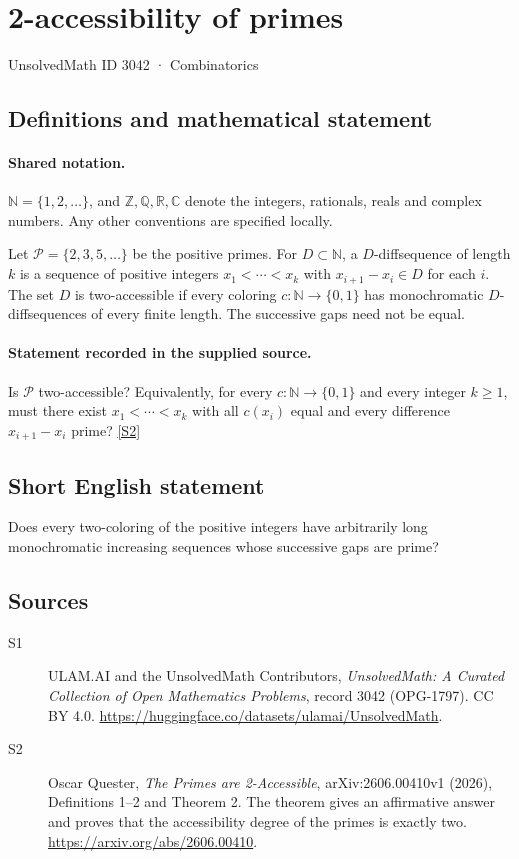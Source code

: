 \documentclass[11pt]{article}
\newcommand{\sref}[2]{\hyperlink{source:#1:#2}{[S#2]}}
\begin{document}
\setcounter{section}{3041}
\section{2-accessibility of primes}\label{3042}
{\small\sffamily UnsolvedMath ID 3042 · Combinatorics}
\subsection{Definitions and mathematical statement}

\paragraph{Shared notation.}$\mathbb N=\{1,2,\ldots\}$, and $\mathbb Z,\mathbb Q,\mathbb R,\mathbb C$ denote the integers, rationals, reals and complex numbers. Any other conventions are specified locally.


Let $\mathcal P=\{2,3,5,\ldots\}$ be the positive primes. For $D\subset\mathbb N$, a $D$-diffsequence of length $k$ is a sequence of positive integers $x_1<\cdots<x_k$ with $x_{i+1}-x_i\in D$ for each $i$. The set $D$ is two-accessible if every coloring $c:\mathbb N\to\{0,1\}$ has monochromatic $D$-diffsequences of every finite length. The successive gaps need not be equal.
\paragraph{Statement recorded in the supplied source.}
Is $\mathcal P$ two-accessible? Equivalently, for every $c:\mathbb N\to\{0,1\}$ and every integer $k\geq1$, must there exist $x_1<\cdots<x_k$ with all $c(x_i)$ equal and every difference $x_{i+1}-x_i$ prime? \sref{3042}{2}
\subsection{Short English statement}
Does every two-coloring of the positive integers have arbitrarily long monochromatic increasing sequences whose successive gaps are prime?
\subsection{Sources}
\begin{description}
\item[\hypertarget{source:3042:1}{S1}] ULAM.AI and the UnsolvedMath Contributors, \emph{UnsolvedMath: A Curated Collection of Open Mathematics Problems}, record 3042 (OPG-1797). CC BY 4.0. \url{https://huggingface.co/datasets/ulamai/UnsolvedMath}.
\item[\hypertarget{source:3042:2}{S2}] Oscar Quester, \emph{The Primes are 2-Accessible}, arXiv:2606.00410v1 (2026), Definitions 1--2 and Theorem 2. The theorem gives an affirmative answer and proves that the accessibility degree of the primes is exactly two. \url{https://arxiv.org/abs/2606.00410}.
\end{description}
\label{end:3042}
\end{document}
